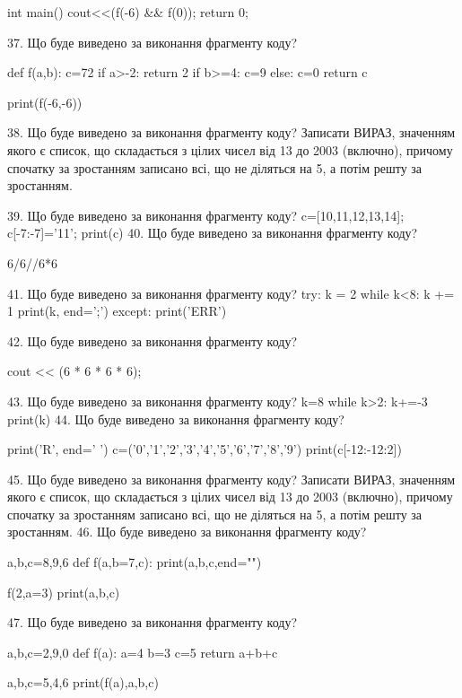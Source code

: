 \documentclass[11pt]{article}
\begin{document}
int main(){
    cout<<(f(-6) && f(0));
    return 0;
}

37. Що буде виведено за виконання фрагменту коду?

def f(a,b):
    c=72
    if a>-2:
        return 2
    if b>=4:
         c=9
    else: 
        c=0
    return c

print(f(-6,-6))

38. Що буде виведено за виконання фрагменту коду?
Записати ВИРАЗ, значенням якого є список, що складається з цілих чисел від 13 до 2003 (включно), причому спочатку за зростанням записано всі, що не діляться на 5, а потім решту за зростанням.

39. Що буде виведено за виконання фрагменту коду?
c=[10,11,12,13,14]; c[-7:-7]='11'; print(c)
40. Що буде виведено за виконання фрагменту коду?

6/6//6*6

41. Що буде виведено за виконання фрагменту коду?
try:
    k = 2
    while k<8:
        k += 1
    print(k, end=';')
except:
    print('ERR')

42. Що буде виведено за виконання фрагменту коду?

cout << (6 * 6 * 6 * 6);

43. Що буде виведено за виконання фрагменту коду?
k=8
   while k>2: k+=-3
   print(k)
44. Що буде виведено за виконання фрагменту коду?

print('R', end=' ')
c=('0','1','2','3','4','5','6','7','8','9')
print(c[-12:-12:2])


45. Що буде виведено за виконання фрагменту коду?
Записати ВИРАЗ, значенням якого є список, що складається з цілих чисел від 13 до 2003 (включно), причому спочатку за зростанням записано всі, що не діляться на 5, а потім решту за зростанням.
46. Що буде виведено за виконання фрагменту коду?

a,b,c=8,9,6
def f(a,b=7,c):
    print(a,b,c,end="")

f(2,a=3)
print(a,b,c)


47. Що буде виведено за виконання фрагменту коду?

a,b,c=2,9,0
def f(a):
    a=4
    b=3
    c=5
    return a+b+c

a,b,c=5,4,6
print(f(a),a,b,c)
\end{document}
